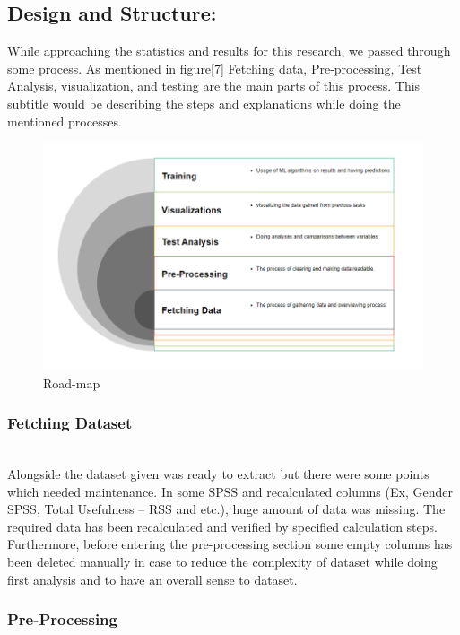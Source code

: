 \documentclass[letterpaper, 10 pt, conference]{ieeeconf}
\begin{document}
\subsection{Design and Structure:}
While approaching the statistics and results for this research, we passed through some process. As mentioned in figure[7] Fetching data, Pre-processing, Test Analysis, visualization, and testing are the main parts of this process. This subtitle would be describing the steps and explanations while doing the mentioned processes.\\


\begin{figure}[!ht]
    \centering
    \includegraphics[scale = 0.4]{Picture7.png}
    \caption{Road-map}
    
\end{figure}



\subsubsection{Fetching Dataset}\hfill\\

Alongside the dataset given was ready to extract but there were some points which needed maintenance. In some SPSS and recalculated columns (Ex, Gender SPSS, Total Usefulness – RSS and etc.), huge amount of data was missing. The required data has been recalculated and verified by specified calculation steps. Furthermore, before entering the pre-processing section some empty columns has been deleted manually in case to reduce the complexity of dataset while doing first analysis and to have an overall sense to dataset.\\

\subsubsection{Pre-Processing}\hfill\\
\end{document}
